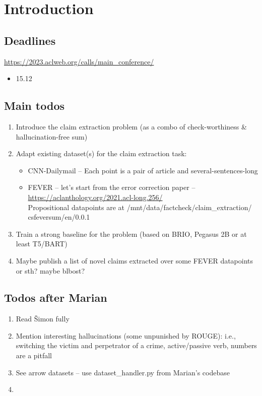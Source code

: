 \section{Introduction}\label{sec:intro}
\todo{}
\subsection{Deadlines}
\url{https://2023.aclweb.org/calls/main\_conference/}
\begin{itemize}
    \item 15.12
\end{itemize}
\subsection{Main todos}
\begin{enumerate}
    \item Introduce the claim extraction problem (as a combo of check-worthiness \& hallucination-free sum)
    \item Adapt existing dataset(s) for the claim extraction task:
     \begin{itemize}
        \item CNN-Dailymail -- Each point is a pair of article and several-sentences-long 
        \item FEVER -- let's start from the error correction paper -- \url{https://aclanthology.org/2021.acl-long.256/}\\
        Propositional datapoints are at /mnt/data/factcheck/claim\_extraction/ csfeversum/en/0.0.1
    \end{itemize}
    \item Train a strong baseline for the problem (based on BRIO, Pegasus 2B or at least T5/BART)
    \item Maybe publish a list of novel claims extracted over some FEVER datapoints or sth? maybe blbost?
\end{enumerate}

\subsection{Todos after Marian}
\begin{enumerate}
    \item Read Šimon fully
    \item Mention interesting hallucinations (some unpunished by ROUGE):  i.e., switching the victim and perpetrator of a crime, active/passive verb, numbers are a pitfall
    \item See arrow datasets -- use dataset\_handler.py from Marian's codebase
    \item 
\end{enumerate}